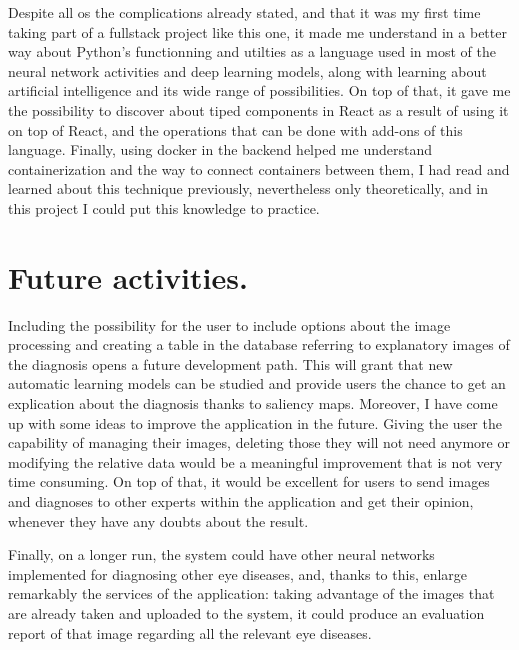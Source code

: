 \par
Despite all os the complications already stated, and that it was my first time taking part of a fullstack project like this one, it made me understand in a better way about Python's functionning and utilties as a language used in most of the neural network activities and deep learning models, along with learning about artificial intelligence and its wide range of possibilities. On top of that, it gave me the possibility to discover about tiped components in React as a result of using it on top of React, and the operations that can be done with add-ons of this language. Finally, using docker in the backend helped me understand containerization and the way to connect containers between them, I had read and learned about this technique previously, nevertheless only theoretically, and in this project I could put this knowledge to practice.
\par
\section{Future activities.}
Including the possibility for the user to include options about the image processing and creating a table in the database referring to explanatory images of the diagnosis opens a future development path. This will grant that new automatic learning models can be studied and provide users the chance to get an explication about the diagnosis thanks to saliency maps. Moreover, I have come up with some ideas to improve the application in the future. Giving the user the capability of managing their images, deleting those they will not need anymore or modifying the relative data would be a meaningful improvement that is not very time consuming. On top of that, it would be excellent for users to send images and diagnoses to other experts within the application and get their opinion, whenever they have any doubts about the result.
\par
Finally, on a longer run, the system could have other neural networks implemented for diagnosing other eye diseases, and, thanks to this, enlarge remarkably the services of the application: taking advantage of the images that are already taken and uploaded to the system, it could produce an evaluation report of that image regarding all the relevant eye diseases. 
\par